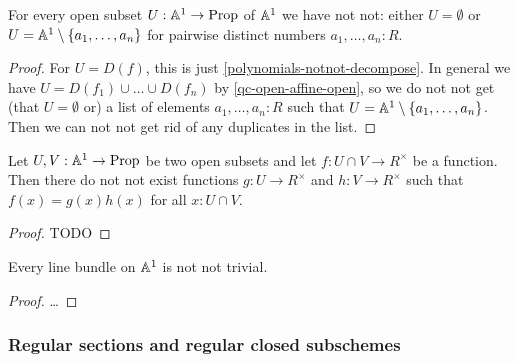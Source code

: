 %

\begin{lemma}
  For every open subset $U : \mathbb{A}^1 \to \mathrm{Prop}$ of $\mathbb{A}^1$
  we have not not:
  either $U = \emptyset$
  or $U = \mathbb{A}^1 \setminus \{ a_1, \dots, a_n \}$
  for pairwise distinct numbers $a_1, \dots, a_n : R$.
\end{lemma}

\begin{proof}
  For $U = D(f)$,
  this is just \cref{polynomials-notnot-decompose}.
  In general we have $U = D(f_1) \cup \dots \cup D(f_n)$
  by \cref{qc-open-affine-open},
  so we do not not get
  (that $U = \emptyset$ or)
  a list of elements $a_1, \dots, a_n : R$
  such that $U = \mathbb{A}^1 \setminus \{ a_1, \dots, a_n \}$.
  Then we can not not get rid of any duplicates in the list.
\end{proof}

\begin{lemma}
  Let $U, V : \mathbb{A}^1 \to \mathrm{Prop}$ be two open subsets
  and let $f : U \cap V \to R^\times$ be a function.
  Then there do not not exist functions
  $g : U \to R^\times$ and
  $h : V \to R^\times$
  such that $f(x) = g(x)h(x)$ for all $x : U \cap V$.
\end{lemma}

\begin{proof}
  TODO
\end{proof}

\begin{theorem}
  Every line bundle on $\mathbb{A}^1$ is not not trivial.
\end{theorem}

\begin{proof}
  \dots
\end{proof}

\subsubsection{Regular sections and regular closed subschemes}

